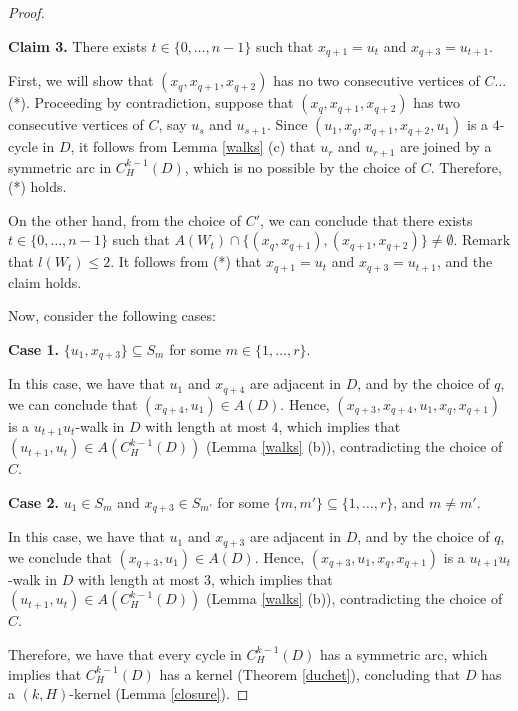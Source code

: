 \documentclass[10pt,a4paper]{article}
\begin{document}
\begin{proof}
	\begin{description}
	\item \textbf{Claim 3.} There exists $t \in \{0, \ldots , n-1\}$ such that $x_{q+1} = u_{t}$ and $x_{q+3} = u_{t+1}$.

First, we will show that  $(x_{q}, x_{q+1}, x_{q+2})$ has no two consecutive vertices of $C$...(*). Proceeding by contradiction, suppose that $(x_{q}, x_{q+1}, x_{q+2})$ has two consecutive vertices of $C$, say $u_{s}$ and $u_{s+1}$. Since $(u_{1}, x_{q}, x_{q+1}, x_{q+2}, u_{1})$ is a $4$-cycle in $D$, it follows from Lemma \ref{walks} (c) that $u_{r}$ and $u_{r+1}$ are joined by a symmetric arc in $C_{H}^{k-1}(D)$, which is no possible by the choice of $C$. Therefore, (*) holds.

On the other hand, from the choice of $C'$, we can conclude that there exists $t \in \{0, \ldots , n-1\}$ such that $A(W_{t}) \cap \{ (x_{q}, x_{q+1}),(x_{q+1}, x_{q+2}) \} \neq \emptyset$. Remark that $l(W_{t}) \leq 2$. It follows from (*) that $x_{q+1} = u_{t}$ and $x_{q+3} = u_{t+1}$, and the claim holds.
\end{description}
	
Now, consider the following cases:
	
	\begin{description}
	\item \textbf{Case 1.} $\{ u_{1}, x_{q+3} \} \subseteq S_{m}$ for some $m \in \{1, \ldots , r \}$.
	
	In this case, we have that $u_{1}$ and $x_{q+4}$ are adjacent in $D$, and by the choice of $q$, we can conclude that $(x_{q+4}, u_{1}) \in A(D)$. Hence, $(x_{q+3}, x_{q+4}, u_{1}, x_{q}, x_{q+1})$ is a $u_{t+1}u_{t}$-walk in $D$ with length at most $4$, which implies that $(u_{t+1}, u_{t}) \in A(C_{H}^{k-1}(D))$ (Lemma \ref{walks} (b)), contradicting the choice of $C$.
	
	\item \textbf{Case 2.} $u_{1} \in S_{m}$ and $x_{q+3} \in S_{m'}$ for some $\{m, m' \} \subseteq \{1, \ldots , r\}$, and $m \neq m'$.
	
	In this case, we have that $u_{1}$ and $x_{q+3}$ are adjacent in $D$, and by the choice of $q$, we conclude that $(x_{q+3}, u_{1}) \in A(D)$. Hence, $(x_{q+3}, u_{1}, x_{q}, x_{q+1})$ is a $u_{t+1}u_{t}$-walk in $D$ with length at most $3$, which implies that $(u_{t+1}, u_{t}) \in A(C_{H}^{k-1}(D))$ (Lemma \ref{walks} (b)), contradicting the choice of $C$.
	\end{description}

Therefore, we have that every cycle in $C_{H}^{k-1}(D)$ has a symmetric arc, which implies that $C_{H}^{k-1}(D)$ has a kernel (Theorem \ref{duchet}), concluding that $D$ has a $(k,H)$-kernel (Lemma \ref{closure}).
\end{proof}
\end{document}
